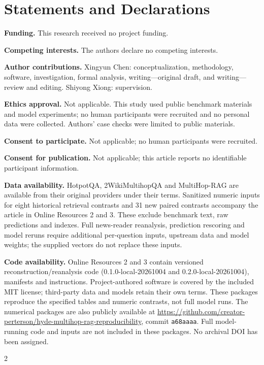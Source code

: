 \documentclass[pdflatex,sn-basic,Numbered]{sn-jnl}
\begin{document}






\FloatBarrier



\section*{Statements and Declarations}
\begingroup
\footnotesize

\noindent\textbf{Funding.} This research received no project funding.\par
\noindent\textbf{Competing interests.} The authors declare no competing interests.\par
\noindent\textbf{Author contributions.} Xingyun Chen: conceptualization, methodology, software, investigation, formal analysis, writing---original draft, and writing---review and editing. Shiyong Xiong: supervision.\par
\noindent\textbf{Ethics approval.} Not applicable. This study used public benchmark materials and model experiments; no human participants were recruited and no personal data were collected. Authors' case checks were limited to public materials.\par
\noindent\textbf{Consent to participate.} Not applicable; no human participants were recruited.\par
\noindent\textbf{Consent for publication.} Not applicable; this article reports no identifiable participant information.\par
\noindent\textbf{Data availability.} HotpotQA, 2WikiMultihopQA and MultiHop-RAG are available from their original providers under their terms. Sanitized numeric inputs for eight historical retrieval contrasts and 31 new paired contrasts accompany the article in Online Resources 2 and 3. These exclude benchmark text, raw predictions and indexes. Full news-reader reanalysis, prediction rescoring and model reruns require additional per-question inputs, upstream data and model weights; the supplied vectors do not replace these inputs.\par
\noindent\textbf{Code availability.} Online Resources 2 and 3 contain versioned reconstruction/reanalysis code (0.1.0-local-20261004 and 0.2.0-local-20261004), manifests and instructions. Project-authored software is covered by the included MIT license; third-party data and models retain their own terms. These packages reproduce the specified tables and numeric contrasts, not full model runs. The numerical packages are also publicly available at \url{https://github.com/creator-perterson/hyde-multihop-rag-reproducibility}, commit \texttt{a68aaaa}. Full model-running code and inputs are not included in these packages. No archival DOI has been assigned.
\endgroup

\setlength{\bibsep}{0pt}
\renewcommand{\bibfont}{\fontsize{8}{9}\selectfont}
\begin{multicols}{2}

\end{multicols}
\end{document}
